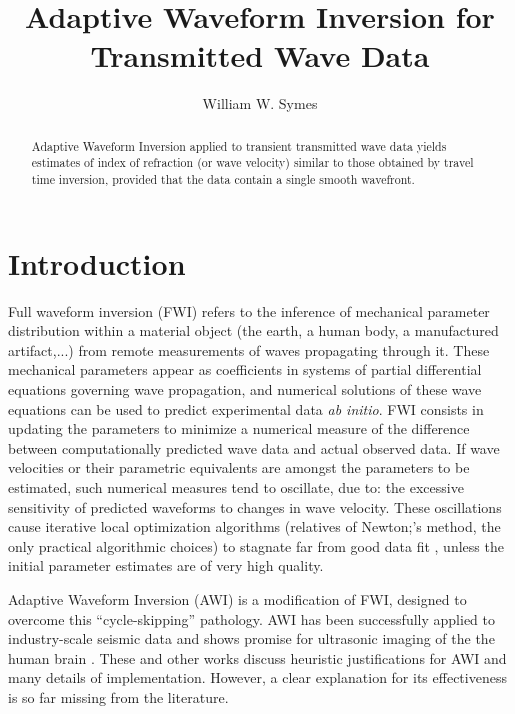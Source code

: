 \title{Adaptive Waveform Inversion for Transmitted Wave Data}
\author{William W. Symes}

\begin{abstract}
Adaptive Waveform Inversion
applied to transient transmitted wave data yields estimates of index of
refraction (or wave velocity) similar to those obtained by travel time
inversion, provided that the data contain a single smooth wavefront.
\end{abstract}

\section{Introduction}
Full waveform inversion (FWI) refers to the inference of mechanical
parameter distribution within a material object  (the earth, a human
body, a manufactured artifact,...) from remote measurements of waves
propagating through it. These mechanical parameters appear as
coefficients in systems of partial differential equations governing
wave propagation, and numerical solutions of these wave equations can
be used to predict experimental data {\em ab initio}. FWI consists in
updating the parameters to minimize a numerical measure of  the difference between computationally
predicted wave data and actual observed
data. If wave velocities or their parametric equivalents are amongst the parameters
to be estimated, such numerical measures tend to oscillate, due to:
the excessive sensitivity of predicted waveforms to changes in wave velocity.
These oscillations cause iterative local optimization algorithms (relatives of
Newton;'s method, the only practical algorithmic choices) to stagnate
far from good data fit \cite[]{VirieuxOperto:09}, unless the initial
parameter estimates are of very high quality.

Adaptive Waveform
Inversion \cite[]{Warner:16} (AWI) is a modification of FWI, designed to overcome this
``cycle-skipping'' pathology. AWI has been successfully applied to
industry-scale seismic data
\cite[]{GuaschWarnerRavaut:GEO19,Warneretal:SEG21} and shows promise
for ultrasonic imaging of the the human brain
\cite[]{Guaschetal:NPJDM20}. These and other works discuss heuristic justifications for AWI
and many details of implementation. However, a clear explanation for its
effectiveness is so far missing from the literature.

